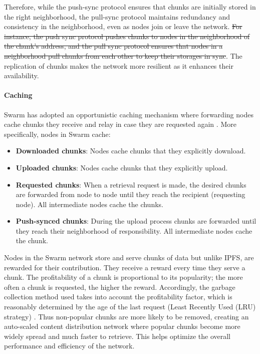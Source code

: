 Therefore, while the push-sync protocol ensures that chunks are initially stored in the right neighborhood, the pull-sync protocol maintains redundancy and consistency in the neighborhood, even as nodes join or leave the network. \sout{For instance, the push sync protocol pushes chunks to nodes in the neighborhood of the chunk's address, and the pull sync protocol ensures that nodes in a neighborhood pull chunks from each other to keep their storages in sync}. The replication of chunks makes the network more resilient as it enhances their availability.

\paragraph{Caching}\label{par:caching_swarm}
Swarm has adopted an opportunistic caching mechanism where forwarding nodes cache chunks they receive and relay in case they are requested again \citep[p.~47]{tron_2020}. More specifically, nodes in Swarm cache:

\begin{itemize}
    \item \textbf{Downloaded chunks}: Nodes cache chunks that they explicitly download.
    \item \textbf{Uploaded chunks}: Nodes cache chunks that they explicitly upload.
    \item \textbf{Requested chunks}: When a retrieval request is made, the desired chunks are forwarded from node to node until they reach the recipient (requesting node). All intermediate nodes cache the chunks.
    \item \textbf{Push-synced chunks}: During the upload process chunks are forwarded until they reach their neighborhood of responsibility. All intermediate nodes cache the chunk.
\end{itemize} 

Nodes in the Swarm network store and serve chunks of data but unlike IPFS, are rewarded for their contribution. They receive a reward every time they serve a chunk. The profitability of a chunk is proportional to its popularity; the more often a chunk is requested, the higher the reward. Accordingly, the garbage collection method used takes into account the profitability factor, which is reasonably determined by the age of the last request (Least Recently Used (LRU) strategy) \citep[p.~72]{tron_2020}. Thus non-popular chunks are more likely to be removed, creating an auto-scaled content distribution network \citep[p.~72]{tron_2020} where popular chunks become more widely spread and much faster to retrieve. This helps optimize the overall performance and efficiency of the network.

